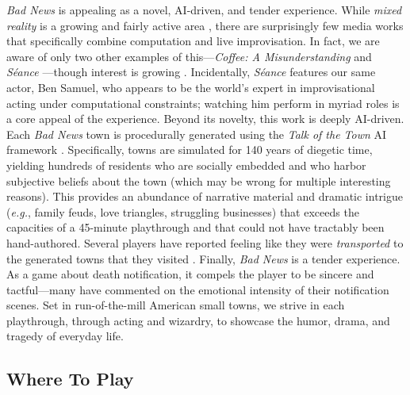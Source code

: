 \documentclass[letterpaper]{article}
\begin{document}
\textit{Bad News} is appealing as a novel, AI-driven, and tender experience. While \textit{mixed reality} is a growing and fairly active area \cite{ohta2014mixed}, there are surprisingly few media works that specifically combine computation and live improvisation. In fact, we are aware of only two other examples of this---\textit{Coffee: A Misunderstanding} \cite{squinkifer2014coffee} and \textit{S\'{e}ance} \cite{seance}---though interest is growing \cite{martens2016towards}. Incidentally, \textit{S\'{e}ance} features our same actor, Ben Samuel, who appears to be the world's expert in improvisational acting under computational constraints; watching him perform in myriad roles is a core appeal of the experience. Beyond its novelty, this work is deeply AI-driven. Each \textit{Bad News} town is procedurally generated using the \textit{Talk of the Town} AI framework \cite{ryan2015toward}. Specifically, towns are simulated for 140 years of diegetic time, yielding hundreds of residents who are socially embedded and who harbor subjective beliefs about the town (which may be wrong for multiple interesting reasons). This provides an abundance of narrative material and dramatic intrigue (\textit{e.g.}, family feuds, love triangles, struggling businesses) that exceeds the capacities of a 45-minute playthrough and that could not have tractably been hand-authored. Several players have reported feeling like they were \textit{transported} to the generated towns that they visited \cite{green2004understanding}. Finally, \textit{Bad News} is a tender experience. As a game about death notification, it compels the player to be sincere and tactful---many have commented on the emotional intensity of their notification scenes. Set in run-of-the-mill American small towns, we strive in each playthrough, through acting and wizardry, to showcase the humor, drama, and tragedy of everyday life.

\subsection{Where To Play}
\end{document}
